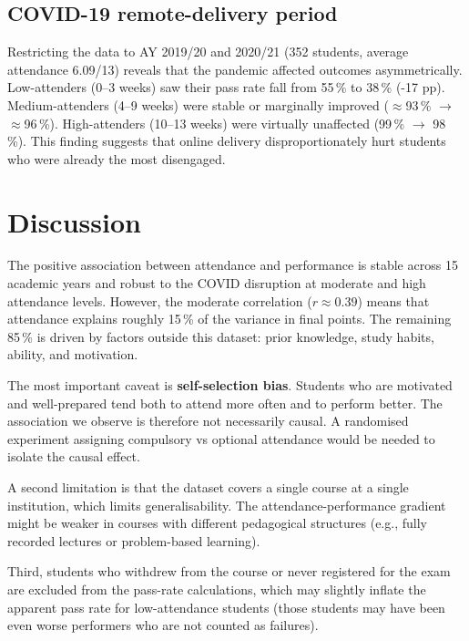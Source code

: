 \documentclass[final,3p,times,twocolumn]{elsarticle}
\begin{document}
\subsection{COVID-19 remote-delivery period}

Restricting the data to AY 2019/20 and 2020/21 (352 students,
average attendance 6.09/13) reveals that the pandemic affected
outcomes asymmetrically.
Low-attenders (0--3 weeks) saw their pass rate fall from 55\,\% to
38\,\% (-17 pp).
Medium-attenders (4--9 weeks) were stable or marginally improved
($\approx$93\,\% $\to$ $\approx$96\,\%).
High-attenders (10--13 weeks) were virtually unaffected
(99\,\% $\to$ 98\,\%).
This finding suggests that online delivery disproportionately
hurt students who were already the most disengaged.


\section{Discussion}
\label{sec:discussion}

The positive association between attendance and performance is
stable across 15 academic years and robust to the COVID disruption
at moderate and high attendance levels.
However, the moderate correlation ($r \approx 0.39$) means that
attendance explains roughly 15\,\% of the variance in final points.
The remaining 85\,\% is driven by factors outside this dataset:
prior knowledge, study habits, ability, and motivation.

The most important caveat is \textbf{self-selection bias}.
Students who are motivated and well-prepared tend both to attend
more often and to perform better.
The association we observe is therefore not necessarily causal.
A randomised experiment assigning compulsory vs optional attendance
would be needed to isolate the causal effect.

A second limitation is that the dataset covers a single course
at a single institution, which limits generalisability.
The attendance-performance gradient might be weaker in courses
with different pedagogical structures (e.g., fully recorded lectures
or problem-based learning).

Third, students who withdrew from the course or never registered
for the exam are excluded from the pass-rate calculations, which
may slightly inflate the apparent pass rate for low-attendance students
(those students may have been even worse performers who are not
counted as failures).
\end{document}
